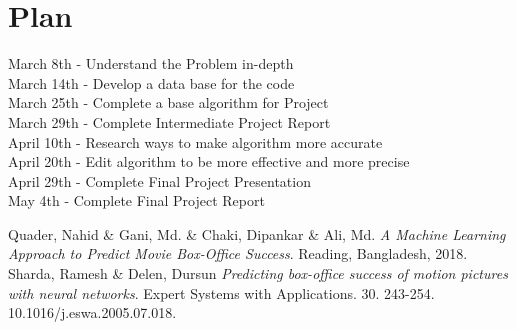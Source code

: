 \documentclass[10pt,twocolumn,letterpaper]{article}
\begin{document}
\section{Plan}
	March 8th - Understand the Problem in-depth\\
	March 14th - Develop a data base for the code\\
	March 25th - Complete a base algorithm for Project\\
	March 29th - Complete Intermediate Project Report\\
	April 10th - Research ways to make algorithm more accurate\\
	April 20th - Edit algorithm to be more effective and more precise\\ 
	April 29th - Complete Final Project Presentation\\
	May 4th - Complete Final Project Report


\begin{thebibliography}{9}
	Quader, Nahid \& Gani, Md. \& Chaki, Dipankar \& Ali, Md. 
	\textit{A Machine Learning Approach to Predict Movie Box-Office Success}. 
	Reading, Bangladesh, 2018.
	Sharda, Ramesh \& Delen, Dursun 
	\textit{Predicting box-office success of motion pictures with neural networks}. 
	Expert Systems with Applications. 30. 243-254. 10.1016/j.eswa.2005.07.018.
\end{thebibliography}
\end{document}
